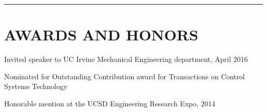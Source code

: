 \documentclass{res}
\begin{document}
\begin{resume}
%

\vspace*{-2ex}
\hspace{-8.5ex}\rule{16.5cm}{0.4pt}
 \vspace*{-3ex}
\section{AWARDS AND HONORS} 
\vspace{0ex}
Invited speaker to UC Irvine Mechanical Engineering department, April 2016 \\
\vspace*{-4.5ex}

Nominated for Outstanding Contribution award for Transactions on Control Systems Technology \\
\vspace*{-4.5ex}

Honorable mention at the UCSD Engineering Research Expo, 2014

\vspace*{-3ex}


\end{resume}
\end{document}
